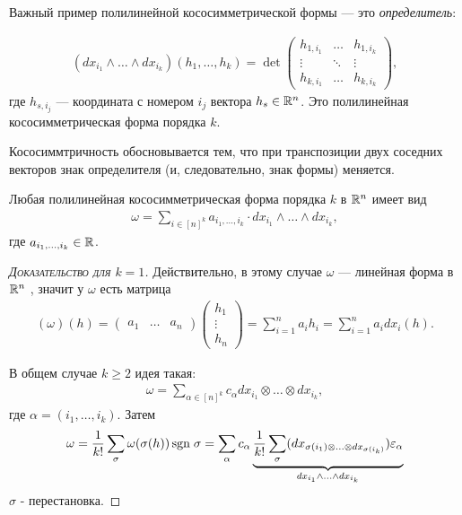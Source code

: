 \begin{exmpl}
 Важный пример полилинейной кососимметрической формы --- это \textit{определитель}:

 
\begin{align*}
 \left( dx_{i_1} \land \ldots \land dx_{i_k} \right)(h_1, \ldots, h_k) = \det \begin{pmatrix}
  h_{1,i_1} & \ldots & h_{1,i_k} \\
  \vdots & \ddots & \vdots \\
  h_{k,i_{1}} & \ldots & h_{k,i_k}
 \end{pmatrix},
\end{align*} где $h_{s,i_j}$ --- координата с номером $i_j$ вектора $h_s \in \mathbb{R}^{n}$. Это полилинейная кососимметрическая форма порядка $k$.

Кососиммтричность обосновывается тем, что при транспозиции двух соседних векторов знак определителя (и, следовательно, знак формы) меняется.

\end{exmpl}
\begin{thm}[%
из алгебры]
\label{theoream:determinant_is_only_polylinear_antisymmetric_form}
 Любая полилинейная кососимметрическая форма порядка $k$ в $\mathbb{R}^{n}$ имеет вид
 \begin{align*}
  \omega = \sum_{i \in [n]^{k}} a_{i_1,\ldots,i_k} \cdot dx_{i_1} \land \ldots \land dx_{i_k}
 ,\end{align*} где $a_{i_1,\ldots,i_k} \in \mathbb{R}$.
\end{thm}
\begin{proof}[\normalfont\textsc{Доказательство для $k=1$}]
 Действительно, в этому случае $\omega$ --- линейная форма в  $\mathbb{R}^{n}$ , значит у $\omega$  есть матрица
 \begin{align*}
  (\omega)(h) = \begin{pmatrix}
   a_1 & \ldots & a_n
  \end{pmatrix} \begin{pmatrix}
   h_1 \\
   \vdots \\
   h_n
  \end{pmatrix} = \sum_{i=1}^{n} a_i h_i = \sum_{i=1}^{n} a_i dx_i(h)
 .\end{align*}

 В общем случае $k \geqslant 2$ идея такая:
 \begin{align*}
  \omega = \sum_{\alpha \in [n]^{k}} c_{\alpha} dx_{i_1} \otimes \ldots \otimes dx_{i_k}
 ,\end{align*}  где $\alpha = (i_1, \ldots, i_k)$. Затем
 \begin{align*}
  \omega = \frac{1}{k!} \sum_{\sigma} \omega(\sigma(h)) \,\mathrm{sgn}\;\sigma = \sum_{\alpha} c_{\alpha} \underbrace{\frac{1}{k!} \sum_{\sigma} (dx_{\sigma(i_1) \otimes \ldots \otimes dx_{\sigma(i_k)}})\varepsilon_{\alpha}}_{dx_{i_1} \land \ldots \land dx_{i_k}}
 \end{align*} 
 $\sigma$ - перестановка. 
\end{proof}
